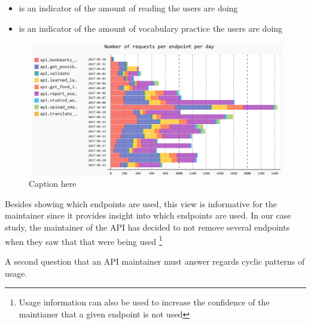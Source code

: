 \documentclass[conference]{IEEEtran}
\begin{document}
  \begin{itemize}

    \item {\color{myblue}\epTranslations} is an indicator of the amount of reading the users are doing

    \item {\color{myviolet} \epOutcome} is an indicator of the amount of vocabulary practice the users are doing

  \end{itemize}




  \begin{figure}[h!]
    \centering
    \includegraphics[width=\linewidth]{all_endpoints_usage.png}
    \caption{Caption here}
    \label{fig:aeu}
  \end{figure}


  Besides showing which endpoints are used, this view is informative for the maintainer since it provides insight into which endpoints are used. In our case study, the maintainer of the API has decided to not remove several endpoints when they saw that that were being used \footnote{Usage information can also be used to increase the confidence of the maintianer that a given endpoint is not used}

  \niceseparator

  A second question that an API maintainer must answer regards cyclic patterns of usage. 


\end{document}
